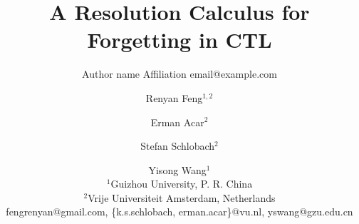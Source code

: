 \documentclass{article}
\title{A Resolution Calculus for Forgetting in CTL}
\author{%
    Author name
    \affiliations
    Affiliation
    \emails
    email@example.com    %
}
\author{%
Renyan Feng$^{1,2}$\and
Erman Acar$^2$\and
Stefan Schlobach$^{2}$\and
Yisong Wang$^1$ \\
\affiliations
$^{1}$Guizhou University, P. R. China\\
$^{2}$Vrije Universiteit Amsterdam, Netherlands\\
\emails
fengrenyan@gmail.com,
\{k.s.schlobach, erman.acar\}@vu.nl,
yswang@gzu.edu.cn
}
\begin{document}
\newcommand{\tuple}[1]{{\langle{#1}\rangle}}
\newcommand{\Mod}{\textit{Mod}}
\newcommand\ie{{\it i.e. }}
\newcommand\eg{{\it e.g.}}
\newtheorem{definition}{Definition}
\newtheorem{lemma}{Lemma}
\newtheorem{proposition}{Proposition}
\newtheorem{corollary}[theorem]{Corollary}
\newcommand{\rto}{\rightarrow}
\newcommand{\lto}{\leftarrow}
\newcommand{\lrto}{\leftrightarrow}
\newcommand{\Rto}{\Rightarrow}
\newcommand{\Lto}{\Leftarrow}
\newcommand{\LRto}{\Leftrightarrow}
\newcommand{\Var}{\textit{Var}}
\newcommand{\Forget}{\textit{Forget}}
\newcommand{\KForget}{\textit{KForget}}
\newcommand{\TForget}{\textit{TForget}}
\newcommand{\Fst}{\textit{Fst}}
\newcommand{\dep}{\textit{dep}}
\newcommand{\term}{\textit{term}}
\newcommand{\literal}{\textit{literal}}

\newcommand{\Atom}{\mathcal{A}}
\newcommand{\SFive}{\textbf{S5}}
\newcommand{\MPK}{\textsc{k}}
\newcommand{\MPB}{\textsc{b}}
\newcommand{\MPT}{\textsc{t}}
\newcommand{\MPA}{\forall}
\newcommand{\MPE}{\exists}

\newcommand{\DNF}{\textit{DNF}}
\newcommand{\CNF}{\textit{CNF}}

\newcommand{\degree}{\textit{degree}}
\newcommand{\sunfold}{\textit{sunfold}}

\newcommand{\Pos}{\textit{Pos}}
\newcommand{\Neg}{\textit{Neg}}
\newcommand\wrt{{\it w.r.t.}}
\newcommand{\Hm} {{\cal M}}
\newcommand{\Hw} {{\cal W}}
\newcommand{\Hr} {{\cal R}}
\newcommand{\Hb} {{\cal B}}
\newcommand{\Ha} {{\cal A}}

\newcommand{\Dsj}{\triangledown}

\newcommand{\wnext}{\widetilde{\bigcirc}}
\newcommand{\nex}{\bigcirc}
\newcommand{\ness}{\square}
\newcommand{\qness}{\boxminus}
\newcommand{\wqnext}{\widetilde{\circleddash}}
\newcommand{\qnext}{\circleddash}
\newcommand{\may}{\lozenge}
\newcommand{\qmay}{\blacklozenge}
\newcommand{\unt} {{\cal U}}
\newcommand{\since} {{\cal S}}
\newcommand{\SNF} {\textit{SNF$_C$}}
\newcommand{\start}{\textbf{start}}
\newcommand{\Elm}{\textit{Elm}}
\newcommand{\simp}{\textbf{simp}}
\newcommand{\nnf}{\textbf{nnf}}

\newcommand{\CTL}{\textrm{CTL}}
\newcommand{\Ind}{\textrm{Ind}}
\newcommand{\Tran}{\textrm{Tran}}
\newcommand{\Sub}{\textrm{Sub}}
\newcommand{\NI}{\textrm{NI}}
\newcommand{\Inst}{\textrm{Inst}}
\newcommand{\Com}{\textrm{Com}}
\newcommand{\Rp}{\textrm{Rp}}
\newcommand{\forget}{{\textsc{f}_\CTL}}
\newcommand{\ALL}{\textsc{a}}
\newcommand{\EXIST}{\textsc{e}}
\newcommand{\NEXT}{\textsc{x}}
\newcommand{\FUTURE}{\textsc{f}}
\newcommand{\UNTIL}{\textsc{u}}
\newcommand{\GLOBAL}{\textsc{g}}
\newcommand{\UNLESS}{\textsc{w}}
\newcommand{\Def}{\textrm{def}}
\newcommand{\IR}{\textrm{IR}}
\newcommand{\Tr}{\textrm{Tr}}
\newcommand{\dis}{\textrm{dis}}
\def\PP{\ensuremath{\textbf{PP}}}
\def\NgP{\ensuremath{\textbf{NP}}}
\def\W{\ensuremath{\textbf{W}}}
\newcommand{\Pre}{\textrm{Pre}}
\newcommand{\Post}{\textrm{Post}}
\end{document}

